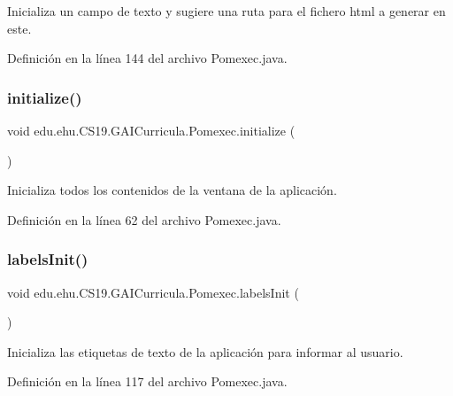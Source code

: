 Inicializa un campo de texto y sugiere una ruta para el fichero html a generar en este. 



Definición en la línea 144 del archivo Pomexec.\+java.

\mbox{\label{a00029_ab89003495509c2f11da18c9675828571}} 
\subsubsection{\texorpdfstring{initialize()}{initialize()}}
{\footnotesize\ttfamily void edu.\+ehu.\+C\+S19.\+G\+A\+I\+Curricula.\+Pomexec.\+initialize (\begin{DoxyParamCaption}{ }\end{DoxyParamCaption})\hspace{0.3cm}{\ttfamily [private]}}



Inicializa todos los contenidos de la ventana de la aplicación. 



Definición en la línea 62 del archivo Pomexec.\+java.

\mbox{\label{a00029_ab5c03aee261eda106376a3111cadaa0a}} 
\subsubsection{\texorpdfstring{labelsInit()}{labelsInit()}}
{\footnotesize\ttfamily void edu.\+ehu.\+C\+S19.\+G\+A\+I\+Curricula.\+Pomexec.\+labels\+Init (\begin{DoxyParamCaption}{ }\end{DoxyParamCaption})}



Inicializa las etiquetas de texto de la aplicación para informar al usuario. 



Definición en la línea 117 del archivo Pomexec.\+java.

\mbox{\label{a00029_a52ecabe81c9c3180cdccb3749b6553d6}} 
